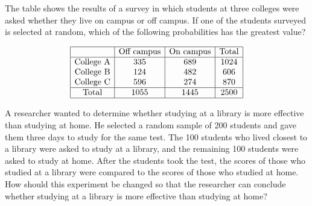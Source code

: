 
\vspace{2em}

\noindent\markforreview
\vspace{1em}

The table shows the results of a survey in which students at three colleges were asked whether they live on campus or off campus.  
If one of the students surveyed is selected at random, which of the following probabilities has the greatest value?

\[
\begin{array}{|c|c|c|c|}
\hline
& \text{Off campus} & \text{On campus} & \text{Total} \\
\hline
\text{College A} & 335 & 689 & 1024 \\
\text{College B} & 124 & 482 & 606 \\
\text{College C} & 596 & 274 & 870 \\
\hline
\text{Total} & 1055 & 1445 & 2500 \\
\hline
\end{array}
\]


\vspace{2em}

\noindent\markforreview
\vspace{1em}

A researcher wanted to determine whether studying at a library is more effective than studying at home. He selected a random sample of 200 students and gave them three days to study for the same test. The 100 students who lived closest to a library were asked to study at a library, and the remaining 100 students were asked to study at home. After the students took the test, the scores of those who studied at a library were compared to the scores of those who studied at home. How should this experiment be changed so that the researcher can conclude whether studying at a library is more effective than studying at home?

